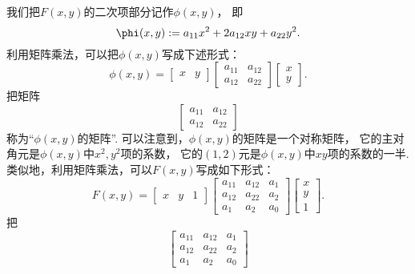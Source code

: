 我们把\(F(x,y)\)的二次项部分记作\(\phi(x,y)\)，
即\begin{equation}
	\phi(x,y)
	\defeq
	a_{11} x^2 + 2 a_{12} x y + a_{22} y^2.
\end{equation}
利用矩阵乘法，可以把\(\phi(x,y)\)写成下述形式：\begin{equation}
	\phi(x,y)
	= \begin{bmatrix}
		x & y
	\end{bmatrix}
	\begin{bmatrix}
		a_{11} & a_{12} \\
		a_{12} & a_{22}
	\end{bmatrix}
	\begin{bmatrix}
		x \\ y
	\end{bmatrix}.
\end{equation}
把矩阵\begin{equation}
	\begin{bmatrix}
		a_{11} & a_{12} \\
		a_{12} & a_{22}
	\end{bmatrix}
\end{equation}
称为“\(\phi(x,y)\)的矩阵”.
可以注意到，\(\phi(x,y)\)的矩阵是一个对称矩阵，
它的主对角元是\(\phi(x,y)\)中\(x^2,y^2\)项的系数，
它的\((1,2)\)元是\(\phi(x,y)\)中\(xy\)项的系数的一半.
类似地，利用矩阵乘法，可以\(F(x,y)\)写成如下形式：\begin{equation}
	F(x,y)
	= \begin{bmatrix}
		x & y & 1
	\end{bmatrix}
	\begin{bmatrix}
		a_{11} & a_{12} & a_1 \\
		a_{12} & a_{22} & a_2 \\
		a_1 & a_2 & a_0
	\end{bmatrix}
	\begin{bmatrix}
		x \\ y \\ 1
	\end{bmatrix}.
\end{equation}
把\begin{equation}
	\begin{bmatrix}
		a_{11} & a_{12} & a_1 \\
		a_{12} & a_{22} & a_2 \\
		a_1 & a_2 & a_0
	\end{bmatrix}
\end{equation}
